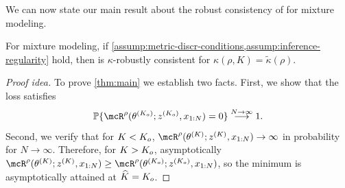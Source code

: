We can now state our main result about the robust consistency of \methodname for mixture modeling. 
\begin{theorem} \label{thm:main}
	For mixture modeling, if \cref{assump:metric-discr-conditions,assump:inference-regularity} hold, then 
    \methodname is $\kappa$-robustly consistent for $\kappa(\rho, K) = \widetilde{\kappa}(\rho)$.
\end{theorem}
\begin{proof}[Proof idea] To prove \cref{thm:main} we establish two facts.
	First, we show that the loss satisfies
	\[
		\Pr\{\mcR^{\rho}(\allparam^{(\numcomps_{o})}; z^{(\numcomps_{o})}, \data{1:\numobs}) = 0 \}   \overset{N \to \infty}{\longrightarrow}  1.
	\]
	Second, we verify that for $K < K_o$,
	$
		\mcR^{\rho}(\allparam^{(\numcomps)}; z^{(\numcomps)}, \data{1:\numobs}) \to \infty
	$
	in probability for $N \to \infty$.
	Therefore, for $K > K_o$, asymptotically
	$\mcR^{\rho}(\allparam^{(\numcomps)}; z^{(\numcomps)}, \data{1:\numobs})  \ge \mcR^{\rho}(\allparam^{(\numcomps_{o})}; z^{(\numcomps_{o})}, \data{1:\numobs})$, so the minimum is asymptotically attained at $\widehat{K}=K_o$.
\end{proof}


